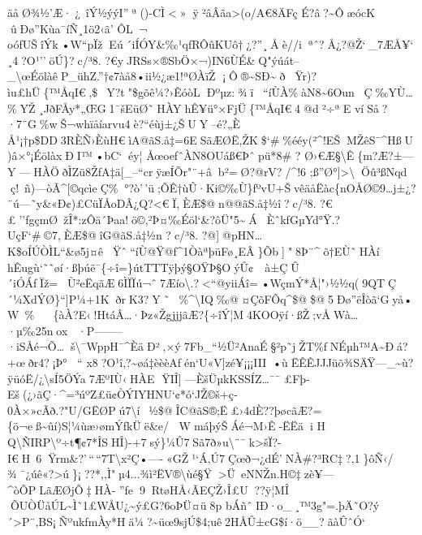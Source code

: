 äåØ¾½'Æ·¿~îÝ½ýýI''ª()-CÌ\textless»ÿ²âÂãa\textgreater(o/A€8ÄFç
É?â?\textasciitilde ÔæócK ûÐø''Kùa¯íÑ¸1ö2‹ã'  ÔL~¬~
oófUŠîÝk•W``pÏžEú´iÍÓY\&‰¹qƒRÔûKUô†¿?''¸Åè//iªˆ?Å¿?@Ž`\_7ÆÅ¥` 
¸4?O¹''öÚ\}?c/³8.
?€yJRSs×®SbÖ×¬)IN6ÙÉ\&Q"ýúát--\_\textbackslash œÉölàêP\_ühZ.''†¢7àå8•ii½¿æ1!ªØÀïŽ
¡Ô®\textasciitilde SÐ\textasciitildeðŸr)?ìu£hÜ\{™ÅqI€,\$~Y?t"\$gõê¼?›ÊóòLÐºµz:¾ï~
``íÙÀ\%àN8\textasciitilde6Oun~
Ç‰YÙ\ldots\%YŽ¸JðFÅy*„ŒG1¯šEüØ˜HÀYh\textbar Ê¥ü°×FjÜ\{™ÅqI€4@d²÷ªE
víSå?·7¨G\%wŠ¬whïåí­arvu4è?{}``éùj±¿ŠUY--é?„È
Å¹¡†p\$DD3RÈÑ›ÈùH€ìA@ãS.å‡=6ESãÆØË,ŽK\$`\#\%ééy(²\^{}!EŠMŽêS¯\^{}HßU)â×°¡ÉölàxÐI™•bC`éy¦
ÅœoeƒˆÀN8OUáß€Þˆpü*8\# ? 
Ø›€Æ§\textbackslash Ê\{m?Æ?±---Y---HÀÖðÌZ\textbar ü8ŽfA‡ä­{[}\_--``crÿæÍÕr"¨+âb²=Ø?@rV?/\^{}!6
;ß''Ø° {]}\textgreater\textbackslashÖû³ßNqd
ç!~ñ)---òÃ\^{}{[}©qcìeÇ\%°\textquotesingle?ò'\,'ü;ÕÊ†ùÛ·Ki©‰Ù\textbar\}ƒºvU+ŠvêäåËàc\{nOÅØ©9\ldots j±¿?¨ú---˜y\&«Ð¢)£CüÏÅoDÂ¿Q?\textless€Ï,ÈÆ\$@n@@ãS.å‡½î?c/³8.
?€£''fgçmØ~žÎ*:zÔä´Þaa!ö©,²Þ¤‰Éöl`\&?ôÜ"5\textasciitildeÁÈˆkfGµYd°Ÿ.?UçF`\#©7,ÈÆ\$@îG@ãS.å‡½n
?c/³8.
?@{]}@pHN\ldots K\$oÍÚÒÌL``\&ø5j¤êŸˆ``íÙ@Ÿ@f\^{}1ÒàªþüFø¸E\textbar Â\}Õb{]}"8Þ¨\^{}õ†E Ù˜HÀí
h\textbar Êugù`˜˜øí·ßþúë¯\{÷î=\}útTTTÿþý§OŸÞ§OýÛ¢~~à±ÇÛ´iÓÁƒÏž=Ù²eËqãÆ6ÌÏÏú¬ˆ7Æío\textbackslash.?\textless``@yiiÁî=•WçmÝ*Å¦"›½½q(9\textbar QTÇ´¼XdÝØ\}``{]}P¼+1KðrK3?Y˜\%\^{}\textbackslash IQ‰@¤ÇõFÕq\^{}\$@\$@5Ðø''ëÎòã`Gyå•W~\%\{àÀ?E‹!HtáÂ\ldots·Þz«ŽgjjjãÆ?\{÷îÝ¦M4KOOÿí·ßŽ;vÅWà\ldots·µ‰25nox
·\textquotesingle P--------·iSÅé¬Õ\ldotsš\textbackslash¯WppH¯\^{}ÈäÐ²‚×ý7Fb\_``½Ü²AnaÉ§²p˜jŽT\%fNÉµh™A\textasciitilde Ðá?+œðr4?¡Þ°
`` 
x8?O¹î,?\textasciitilde øá‡èèèAƒén`U«V{]}zé¥¡¡¡III•ùËÊÊJJJüõ¾SÄŸ---\_\textasciitilde ù?ÿüóË/¿\textbackslash sÍ5ÖÝa7ÆºIÙ‹HÀE
ŸIÎ{]}---ÈšÜµkKSSÍZ\ldots¯¯£Fþ-
Eš(¿›ãÇ·\^{}=³úºZ£ü¢ÒÝIYHNU`¢*ó`JŽ©š+ç­0À×»cÃð.?"U/GËØPú7\textbackslash í~½\$@ÎC@ãS®;Ë£›4dÈ??þøcãÆ?=\{ö¬eß\textasciitilde ûí)S¦¼ùæ›ømÝfkÜë\&e/
W\textquotesingle máþýŠÁé¬M›Ê-ËËäi H
Q\textbackslash ÑIRP\textbackslash º÷t¶¢7*ÎSHÎ)-+7sý\}¼Û7Sã7ð»u\textbackslash¨¯k\textgreater šÏ?-I€H~6Ÿrm\&?'\,``\,``7T\textbackslash x²Ç•----«GŽ¹`Á‚Ú7Çœð¬¿dÉ'\textquotesingle NÀ\#?³RC‡?‚1\}ôÑ‹/¾¯¿úê«?\textgreater ú\}¡??*,,Ì"µ4...¾ì²ËV®\textbackslash ùé§Ÿ\textgreater Ü~eNNŽn.H©‡zè¥---\^{}òÕPLãÆØjÕ‡HÀ-
''fe9RtøHÅ‹ÃEÇŽ›Î£U??ÿ¦MÎ
ÕUÒÜ\textquotesingle åÚL\textasciitilde Ì˜1£WÅU¿\textasciitilde ý£G?6oÞÜ¤ü8p
bÁñˆIÐ·o\_¸™3g"=.þÄ˜O?ý´\textgreater P¨‚BS\textquotesingle¡­ÑºukƒmÀy*Hä¼?\textasciitilde üœ9sjÚ\$4;uê\textbar2HÅÛ±cG\$í·ö\_\_?ãàÛˆÓ` 
